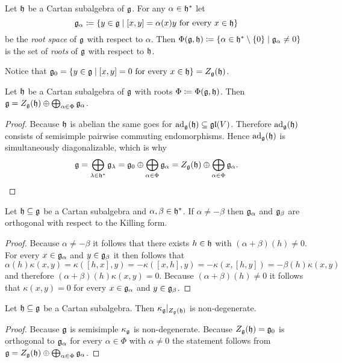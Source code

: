 

\begin{defi}
 Let $\mathfrak{h}$ be a Cartan subalgebra of $\mathfrak{g}$. For any $\alpha \in \mathfrak{h}^*$ let
 \[
  \mathfrak{g}_\alpha \coloneqq \{y \in \mathfrak{g} \mid \text{$[x,y] = \alpha(x)y$ for every $x \in \mathfrak{h}$}\}
 \]
 be the \emph{root space} of $\mathfrak{g}$ with respect to $\alpha$. Then $\Phi(\mathfrak{g}, \mathfrak{h}) \coloneqq \{\alpha \in \mathfrak{h}^* \setminus \{0\} \mid \mathfrak{g}_\alpha \neq 0\}$ is the set of \emph{roots} of $\mathfrak{g}$ with respect to $\mathfrak{h}$.
\end{defi}


\begin{rem}
 Notice that $\mathfrak{g}_0 = \{y \in \mathfrak{g} \mid \text{$[x,y] = 0$ for every $x \in \mathfrak{h}$}\} = Z_{\mathfrak{g}}(\mathfrak{h})$.
\end{rem}



\begin{lem}
 Let $\mathfrak{h}$ be a Cartan subalgebra of $\mathfrak{g}$ with roots $\Phi \coloneqq \Phi(\mathfrak{g}, \mathfrak{h})$. Then $\mathfrak{g} = Z_{\mathfrak{g}}(\mathfrak{h}) \oplus \bigoplus_{\alpha \in \Phi} \mathfrak{g}_\alpha$.
\end{lem}
\begin{proof}
 Because $\mathfrak{h}$ is abelian the same goes for $\operatorname{ad}_{\mathfrak{g}}(\mathfrak{h}) \subseteq \mathfrak{gl}(V)$. Therefore $\operatorname{ad}_{\mathfrak{g}}(\mathfrak{h})$ consists of semisimple pairwise commuting endomorphisms. Hence $\operatorname{ad}_{\mathfrak{g}}(\mathfrak{h})$ is simultaneously diagonalizable, which is why
 \[
  \mathfrak{g}
  = \bigoplus_{\lambda \in \mathfrak{h}^*} \mathfrak{g}_\lambda
  = \mathfrak{g}_0 \oplus \bigoplus_{\alpha \in \Phi} \mathfrak{g}_\alpha
  = Z_{\mathfrak{g}}(\mathfrak{h}) \oplus \bigoplus_{\alpha \in \Phi} \mathfrak{g}_\alpha.
  \qedhere
 \]
\end{proof}




\begin{lem}
Let $\mathfrak{h} \subseteq \mathfrak{g}$ be a Cartan subalgebra and $\alpha, \beta \in \mathfrak{h}^*$. If $\alpha \neq -\beta$ then $\mathfrak{g}_\alpha$ and $\mathfrak{g}_\beta$ are orthogonal with respect to the Killing form.
\end{lem}
\begin{proof}
 Because $\alpha \neq -\beta$ it follows that there exists $h \in \mathfrak{h}$ with $(\alpha+\beta)(h) \neq 0$. For every $x \in \mathfrak{g}_\alpha$ and $y \in \mathfrak{g}_\beta$ it then follows that
 \[
  \alpha(h) \kappa(x,y)
  = \kappa([h,x],y)
  = -\kappa([x,h],y)
  = -\kappa(x,[h,y])
  = -\beta(h)\kappa(x,y)
 \]
 and therefore $(\alpha+\beta)(h)\kappa(x,y) = 0$. Because $(\alpha+\beta)(h) \neq 0$ it follows that $\kappa(x,y) = 0$ for every $x \in \mathfrak{g}_\alpha$ and $y \in \mathfrak{g}_\beta$.
\end{proof}


\begin{cor}
 Let $\mathfrak{h} \subseteq \mathfrak{g}$ be a Cartan subalgebra. Then $\kappa_{\mathfrak{g}}|_{Z_{\mathfrak{g}}(\mathfrak{h})}$ is non-degenerate.
\end{cor}
\begin{proof}
 Because $\mathfrak{g}$ is semisimple $\kappa_{\mathfrak{g}}$ is non-degenerate. Because $Z_{\mathfrak{g}}(\mathfrak{h}) = \mathfrak{g}_0$ is orthogonal to $\mathfrak{g}_\alpha$ for every $\alpha \in \Phi$ with $\alpha \neq 0$ the statement follows from $\mathfrak{g} = Z_{\mathfrak{g}}(\mathfrak{h}) \oplus \bigoplus_{\alpha \in \Phi} \mathfrak{g}_\alpha$.
\end{proof}






